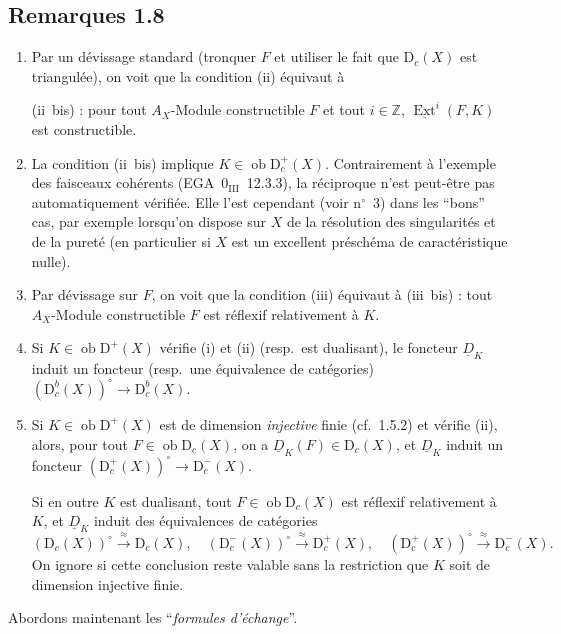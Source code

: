 \documentclass[11pt]{article}
\DeclareMathOperator{\Ext}{Ext}
\newcommand{\D}{\mathrm{D}}
\newcommand{\Z}{\mathbb{Z}}
\newcommand{\ob}{\operatorname{ob}}
\providecommand{\ob}{\operatorname{ob}}
\providecommand{\Z}{\mathbb Z}
\begin{document}
\subsection*{Remarques 1.8}
\begin{enumerate}[label=\alph*)]
\item Par un dévissage standard (tronquer $F$ et utiliser le fait que $\D_c(X)$ est triangulée), on voit que la condition (ii) équivaut à

(ii~bis) : pour tout $A_X$-Module constructible $F$ et tout $i \in \Z$, $\underline{\Ext}^i(F,K)$ est constructible.

\item La condition (ii~bis) implique $K \in \ob \D_c^{+}(X)$. Contrairement à l'exemple des faisceaux cohérents (EGA~$0_{\mathrm{III}}$~12.3.3), la réciproque n'est peut-être pas automatiquement vérifiée. Elle l'est cependant (voir n${}^{\circ}$~3) dans les ``bons'' cas, par exemple lorsqu'on dispose sur $X$ de la résolution des singularités et de la pureté (en particulier si $X$ est un excellent préschéma de caractéristique nulle).

\item Par dévissage sur $F$, on voit que la condition (iii) équivaut à (iii~bis) : tout $A_X$-Module constructible $F$ est réflexif relativement à $K$.

\item Si $K \in \ob \D^{+}(X)$ vérifie (i) et (ii) (resp.~est dualisant), le foncteur $\underline{D}_K$ induit un foncteur (resp.~une équivalence de catégories) $(\D_c^{b}(X))^{\circ} \to \D_c^{b}(X)$.

\item Si $K \in \ob \D^{+}(X)$ est de dimension \emph{injective} finie (cf.~1.5.2) et vérifie (ii), alors, pour tout $F \in \ob \D_c(X)$, on a $\underline{D}_K(F) \in \D_c(X)$, et $\underline{D}_K$ induit un foncteur $(\D_c^{+}(X))^{\circ} \to \D_c^{-}(X)$.

Si en outre $K$ est dualisant, tout $F \in \ob \D_c(X)$ est réflexif relativement à $K$, et $\underline{D}_K$ induit des équivalences de catégories
\[
(\D_c(X))^{\circ} \xrightarrow{\approx} \D_c(X), \quad (\D_c^{-}(X))^{\circ} \xrightarrow{\approx} \D_c^{+}(X), \quad (\D_c^{+}(X))^{\circ} \xrightarrow{\approx} \D_c^{-}(X).
\]
On ignore si cette conclusion reste valable sans la restriction que $K$ soit de dimension injective finie.
\end{enumerate}

Abordons maintenant les ``\emph{formules d'échange}''.
\end{document}
